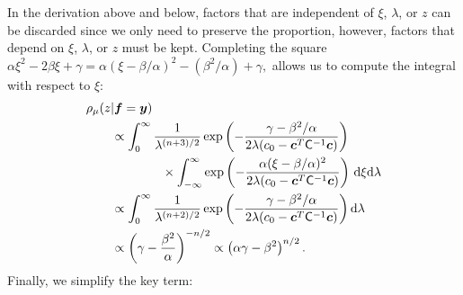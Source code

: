 \documentclass[twocolumn]{svjour3}          %
\newcommand{\bm}[1]{\boldsymbol{#1}}
\newcommand{\D}[1]{\text{d}{#1}}
\newcommand{\vc}{\bm{c}}
\newcommand{\vf}{\bm{f}}
\newcommand{\vy}{\bm{y}}
\newcommand{\mC}{\mathsf{C}}
\begin{document}
In the derivation above and below, factors that are independent of $\xi$, $\lambda$, or $z$ can be discarded since we only need to preserve the proportion, however, factors that depend on $\xi$, $\lambda$, or $z$ must be kept.  
Completing the square $
\alpha \xi^2 -2 \beta \xi + \gamma 
= \alpha (\xi -\beta/\alpha)^2  - (\beta^2/\alpha) + \gamma,
$
allows us to compute the integral with respect to $\xi$:
\begin{align*}
\MoveEqLeft{\rho_{\mu}(z | \vf = \vy)} \\
& \propto \displaystyle \int_{0}^\infty  \frac{1}{\lambda^{(n+3)/2}}  \exp\left( -\frac{  \gamma - \beta^2/\alpha}{2\lambda(c_0  -\vc ^T \mC^{-1} \vc)} \right)  \\
& \qquad \qquad \times \int_{-\infty}^\infty  \exp\left( -\frac{\alpha (\xi -\beta/\alpha)^2}{2\lambda(c_0  -\vc ^T \mC^{-1} \vc)} \right) \, \D \xi \D \lambda \\
& \propto \displaystyle \int_{0}^\infty  \frac{1}{\lambda^{(n+2)/2}}  \exp\left( -\frac{  \gamma - \beta^2/\alpha}{2\lambda(c_0  -\vc ^T \mC^{-1} \vc)} \right) \D \lambda \\
& \propto \left(\gamma - \frac{\beta^2}{\alpha}\right)^{-n/2} \propto \left(\alpha \gamma - \beta^2\right)^{n/2}.
\end{align*}
Finally, we simplify the key term:
\end{document}
